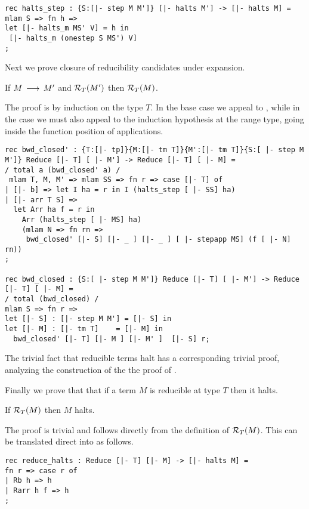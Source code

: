 \begin{lstlisting}
rec halts_step : {S:[|- step M M']} [|- halts M'] -> [|- halts M] =
mlam S => fn h =>
let [|- halts_m MS' V] = h in
 [|- halts_m (onestep S MS') V]
;
\end{lstlisting}

Next we prove closure of reducibility candidates under expansion. 

  \begin{lemma}
   If $M \mathrel{\,\longrightarrow\,} M'$ and $\mathcal{R}_{T}(M')$ then $\mathcal{R}_{T}(M)$.    
  \end{lemma}

The proof is by induction on the type $T$. In the base case we appeal to , while in the  case
we must also appeal to the induction hypothesis at the range type,
going inside the function position of applications.

\begin{lstlisting}
rec bwd_closed' : {T:[|- tp]}{M:[|- tm T]}{M':[|- tm T]}{S:[ |- step M M']} Reduce [|- T] [ |- M'] -> Reduce [|- T] [ |- M] =
/ total a (bwd_closed' a) /
 mlam T, M, M' => mlam SS => fn r => case [|- T] of 
| [|- b] => let I ha = r in I (halts_step [ |- SS] ha)
| [|- arr T S] => 
  let Arr ha f = r in
    Arr (halts_step [ |- MS] ha)
	(mlam N => fn rn =>
	 bwd_closed' [|- S] [|- _ ] [|- _ ] [ |- stepapp MS] (f [ |- N] rn))
;

rec bwd_closed : {S:[ |- step M M']} Reduce [|- T] [ |- M'] -> Reduce [|- T] [ |- M] = 
/ total (bwd_closed) /
mlam S => fn r => 
let [|- S] : [|- step M M'] = [|- S] in 
let [|- M] : [|- tm T]    = [|- M] in
  bwd_closed' [|- T] [|- M ] [|- M' ]  [|- S] r;
\end{lstlisting}


The trivial fact that reducible terms halt has a corresponding
trivial proof, analyzing the construction of the the proof of
.

Finally we prove that that if a term $M$ is reducible at type $T$ then
it halts.

\begin{lemma}
If $\mathcal{R}_{T}(M)$ then $M$ halts.  
\end{lemma}
The proof is trivial and follows directly from the definition of $\mathcal{R}_{T}(M)$. This can be translated direct into \beluga as follows.

\begin{lstlisting}
rec reduce_halts : Reduce [|- T] [|- M] -> [|- halts M] =
fn r => case r of
| Rb h => h
| Rarr h f => h
;
\end{lstlisting}

